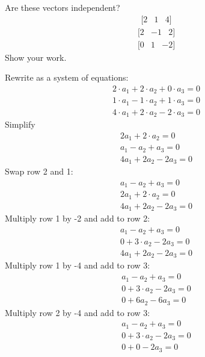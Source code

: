 \begin{Exercise}[title={Vector Independence}, label=vector_independence]
    Are these vectors independent? 
$$\begin{matrix}[2 & 1  & 4]\end{matrix}$$
$$\begin{matrix}[2  & -1  & 2]\end{matrix}$$ 
$$\begin{matrix}[0  & 1  & -2]\end{matrix}$$
Show your work.
\end{Exercise}

\begin{Answer}[ref=vector_independence]
    Rewrite as a system of equations:
        $$\begin{matrix}
			2\cdot a_1 +2\cdot a_2 + 0\cdot a_3 = 0 \\
			1\cdot a_1 - 1\cdot a_2 + 1\cdot a_3 = 0 \\
			4\cdot a_1 + 2\cdot a_2 - 2\cdot a_3 = 0
		  \end{matrix} $$
	Simplify
		$$\begin{matrix}
			2a_1 +2\cdot a_2 = 0 \\
			a_1 - a_2 + a_3 = 0 \\
			4a_1 + 2a_2 - 2a_3 = 0
		  \end{matrix} $$
	Swap row 2 and 1:
		$$\begin{matrix}
			a_1 - a_2 + a_3 = 0 \\
			2a_1 + 2\cdot a_2 = 0 \\
			4a_1 + 2a_2 - 2a_3 = 0
		  \end{matrix} $$
	Multiply row 1 by -2 and add to row 2:
	   $$\begin{matrix}
			a_1 - a_2 + a_3 = 0 \\
			0 +  3\cdot a_2 - 2a_3  = 0 \\
			4a_1 + 2a_2 - 2a_3 = 0
		  \end{matrix} $$
	Multiply row 1 by -4 and add to row 3:	
	    $$\begin{matrix}
			a_1 - a_2 + a_3 = 0 \\
			0 + 3\cdot a_2 -2a_3 = 0 \\
			0 + 6a_2 - 6a_3 = 0
		  \end{matrix} $$
	Multiply row 2 by -4 and add to row 3:
	   $$\begin{matrix}
			a_1 - a_2 + a_3 = 0 \\
			0 + 3\cdot a_2 -2a_3 = 0 \\
			0 + 0 - 2a_3 = 0
		  \end{matrix} $$

\end{Answer}
